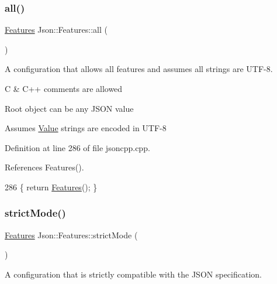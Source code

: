 \subsubsection{\texorpdfstring{all()}{all()}}
{\footnotesize\ttfamily \hyperlink{class_json_1_1_features}{Features} Json\+::\+Features\+::all (\begin{DoxyParamCaption}{ }\end{DoxyParamCaption})\hspace{0.3cm}{\ttfamily [static]}}



A configuration that allows all features and assumes all strings are U\+T\+F-\/8. 


\begin{DoxyItemize}
\item C \& C++ comments are allowed
\item Root object can be any J\+S\+ON value
\item Assumes \hyperlink{class_json_1_1_value}{Value} strings are encoded in U\+T\+F-\/8 
\end{DoxyItemize}

Definition at line 286 of file jsoncpp.\+cpp.



References Features().


\begin{DoxyCode}
286 \{ \textcolor{keywordflow}{return} \hyperlink{class_json_1_1_features_ad15a091cb61bb31323299a95970d2644}{Features}(); \}
\end{DoxyCode}
\mbox{\label{class_json_1_1_features_ae23176c14b2e79e81fb61fb1a8ab58ee}} 
\subsubsection{\texorpdfstring{strict\+Mode()}{strictMode()}}
{\footnotesize\ttfamily \hyperlink{class_json_1_1_features}{Features} Json\+::\+Features\+::strict\+Mode (\begin{DoxyParamCaption}{ }\end{DoxyParamCaption})\hspace{0.3cm}{\ttfamily [static]}}



A configuration that is strictly compatible with the J\+S\+ON specification. 


